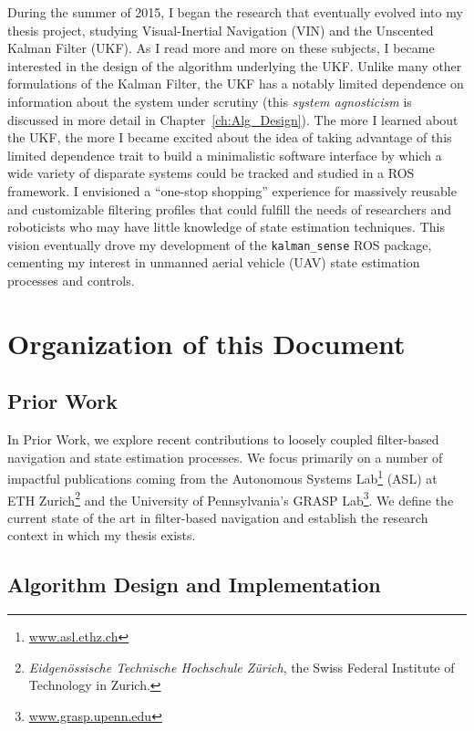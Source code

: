 During the summer of 2015, I began the research that eventually evolved into my thesis project, studying Visual-Inertial Navigation (VIN) and the Unscented Kalman Filter (UKF). As I read more and more on these subjects, I became interested in the design of the algorithm underlying the UKF. Unlike many other formulations of the Kalman Filter, the UKF has a notably limited dependence on information about the system under scrutiny (this \textit{system agnosticism} is discussed in more detail in Chapter~\ref{ch:Alg_Design}). The more I learned about the UKF, the more I became excited about the idea of taking advantage of this limited dependence trait to build a minimalistic software interface by which a wide variety of disparate systems could be tracked and studied in a ROS framework. I envisioned a ``one-stop shopping'' experience for massively reusable and customizable filtering profiles that could fulfill the needs of researchers and roboticists who may have little knowledge of state estimation techniques. This vision eventually drove my development of the \texttt{kalman\_sense} ROS package, cementing my interest in unmanned aerial vehicle (UAV) state estimation processes and controls.


\section{Organization of this Document}

\subsection*{Prior Work}

In Prior Work, we explore recent contributions to loosely coupled filter-based navigation and state estimation processes. We focus primarily on a number of impactful publications coming from the Autonomous Systems Lab\footnote{\url{www.asl.ethz.ch}} (ASL) at ETH Zurich\footnote{\textit{Eidgen{\"o}ssische Technische Hochschule Z{\"u}rich}, the Swiss Federal Institute of Technology in Zurich.} and the University of Pennsylvania's GRASP Lab\footnote{\url{www.grasp.upenn.edu}}. We define the current state of the art in filter-based navigation and establish the research context in which my thesis exists.

\subsection*{Algorithm Design and Implementation}

